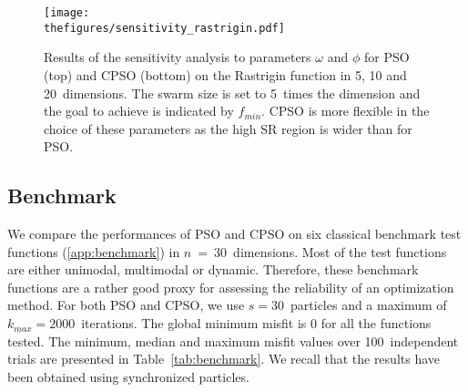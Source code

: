 \begin{figure}[!htbp]
	\centering
	\texttt{[image: \\thefigures/sensitivity\_rastrigin.pdf]}
    \caption{Results of the sensitivity analysis to parameters $\omega$ and $\phi$ for PSO (top) and CPSO (bottom) on the Rastrigin function in 5, 10 and 20~dimensions. The swarm size is set to 5~times the dimension and the goal to achieve is indicated by $f_{min}$. CPSO is more flexible in the choice of these parameters as the high SR region is wider than for PSO.}
    \label{fig:sensana}
\end{figure}


\subsection{Benchmark}
\label{ssec:benchmark}

We compare the performances of PSO and CPSO on six classical benchmark test functions (\ref{app:benchmark}) in $n~=~30$~dimensions. Most of the test functions are either unimodal, multimodal or dynamic. Therefore, these benchmark functions are a rather good proxy for assessing the reliability of an optimization method. For both PSO and CPSO, we use $s = 30$~particles and a maximum of $k_{max} = 2000$~iterations. The global minimum misfit is 0 for all the functions tested. The minimum, median and maximum misfit values over 100~independent trials are presented in Table~\ref{tab:benchmark}. We recall that the results have been obtained using synchronized particles.

\begin{table}[!htbp]
	\centering
	\caption{Results of the benchmark of PSO and CPSO with $s = 30$~particles in $n = 30$~dimensions on six benchmark test functions. The global minimum misfit is 0 for all the functions.}
	\label{tab:benchmark}
\end{table}

